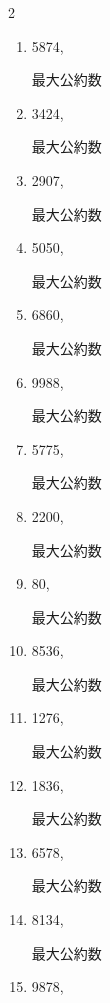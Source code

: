 \begin{multicols}{2}
\begin{enumerate}
  \item 5874,

        最大公約数

  \item 3424,

        最大公約数

\columnbreak %

  \item 2907,

        最大公約数

  \item 5050,

        最大公約数

  \item 6860,

        最大公約数

  \item 9988,

        最大公約数

  \item 5775,

        最大公約数

\columnbreak %

\resetques

  \item 2200,

        最大公約数

  \item 80,

        最大公約数

  \item 8536,

        最大公約数

  \item 1276,

        最大公約数

  \item 1836,

        最大公約数

\columnbreak %

  \item 6578,

        最大公約数

  \item 8134,

        最大公約数

  \item 9878,


\end{enumerate}
\end{multicols}
